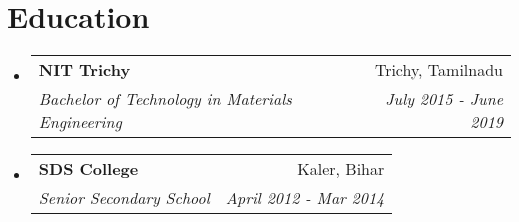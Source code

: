 \documentclass[letterpaper,11pt]{article}
\makeatletter
\newcommand{\resumeSubheading}[4]{
  \vspace{-2pt}\item
    \begin{tabular*}{0.97\textwidth}[t]{l@{\extracolsep{\fill}}r}
      \textbf{#1} & #2 \\
      \textit{\small#3} & \textit{\small #4} \\
    \end{tabular*}\vspace{-7pt}
}
\newcommand{\resumeSubHeadingListStart}{\begin{itemize}[leftmargin=0.15in, label={}]}
\newcommand{\resumeSubHeadingListEnd}{\end{itemize}}
\makeatother
\begin{document}
\section{Education}
  \resumeSubHeadingListStart
    \resumeSubheading
      {NIT Trichy}{Trichy, Tamilnadu}
      {Bachelor of Technology in Materials Engineering}{July 2015 - June 2019}
      \resumeSubheading
      {SDS College}{Kaler, Bihar}
      {Senior Secondary School}{April 2012 - Mar 2014}
    
  \resumeSubHeadingListEnd

%
\end{document}
